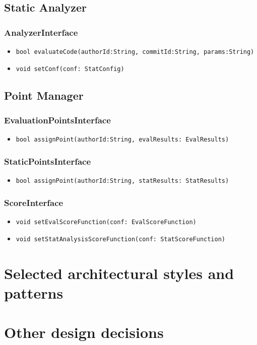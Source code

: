 \subsection{Static Analyzer}
\subsubsection{AnalyzerInterface}
\begin{itemize}
    \item \texttt{bool evaluateCode(authorId:String, commitId:String, params:String)}
    \item \texttt{void setConf(conf: StatConfig)}
\end{itemize}

\subsection{Point Manager}
\subsubsection{EvaluationPointsInterface}
\begin{itemize}
    \item \texttt{bool assignPoint(authorId:String, evalResults: EvalResults)}
\end{itemize}

\subsubsection{StaticPointsInterface}
\begin{itemize}
    \item \texttt{bool assignPoint(authorId:String, statResults: StatResults)}
\end{itemize}

\subsubsection{ScoreInterface}
\begin{itemize}
    \item \texttt{void setEvalScoreFunction(conf: EvalScoreFunction)}
    \item \texttt{void setStatAnalysisScoreFunction(conf: StatScoreFunction)}
\end{itemize}



\section{Selected architectural styles and patterns}
\label{s:selected-architectural-styles-and-patterns}%

\section{Other design decisions}
\label{s:other-design-decisions}%
